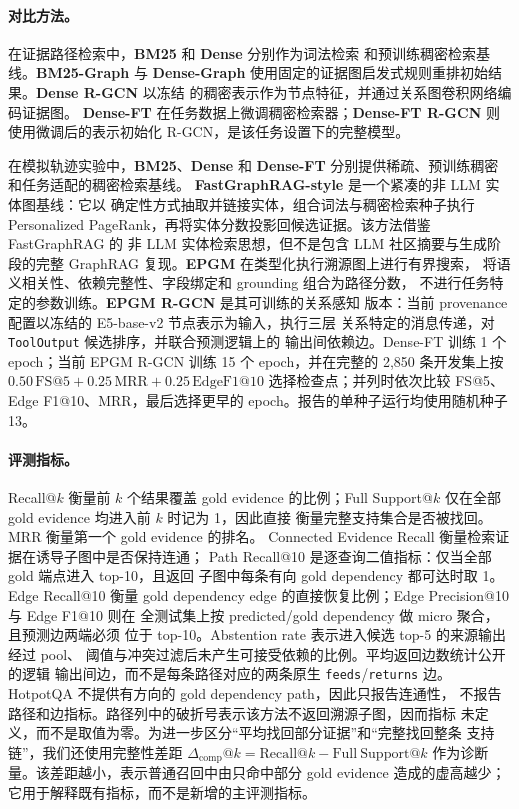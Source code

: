 \paragraph{对比方法。}
在证据路径检索中，\textbf{BM25} 和 \textbf{Dense} 分别作为词法检索
和预训练稠密检索基线。\textbf{BM25-Graph} 与 \textbf{Dense-Graph}
使用固定的证据图启发式规则重排初始结果。\textbf{Dense R-GCN} 以冻结
的稠密表示作为节点特征，并通过关系图卷积网络编码证据图。
\textbf{Dense-FT} 在任务数据上微调稠密检索器；\textbf{Dense-FT R-GCN}
则使用微调后的表示初始化 R-GCN，是该任务设置下的完整模型。

在模拟轨迹实验中，\textbf{BM25}、\textbf{Dense} 和 \textbf{Dense-FT}
分别提供稀疏、预训练稠密和任务适配的稠密检索基线。
\textbf{FastGraphRAG-style} 是一个紧凑的非 LLM 实体图基线：它以
确定性方式抽取并链接实体，组合词法与稠密检索种子执行 Personalized
PageRank，再将实体分数投影回候选证据。该方法借鉴 FastGraphRAG 的
非 LLM 实体检索思想，但不是包含 LLM 社区摘要与生成阶段的完整
GraphRAG 复现。\textbf{EPGM} 在类型化执行溯源图上进行有界搜索，
将语义相关性、依赖完整性、字段绑定和 grounding 组合为路径分数，
不进行任务特定的参数训练。\textbf{EPGM R-GCN} 是其可训练的关系感知
版本：当前 provenance 配置以冻结的 E5-base-v2 节点表示为输入，执行三层
关系特定的消息传递，对 \texttt{ToolOutput} 候选排序，并联合预测逻辑上的
输出间依赖边。Dense-FT 训练 1 个 epoch；当前 EPGM R-GCN 训练 15 个
epoch，并在完整的 2,850 条开发集上按
$0.50\,\mathrm{FS@5}+0.25\,\mathrm{MRR}+0.25\,\mathrm{EdgeF1@10}$
选择检查点；并列时依次比较 FS@5、Edge F1@10、MRR，最后选择更早的
epoch。报告的单种子运行均使用随机种子 13。

\paragraph{评测指标。}
Recall@$k$ 衡量前 $k$ 个结果覆盖 gold evidence 的比例；Full
Support@$k$ 仅在全部 gold evidence 均进入前 $k$ 时记为 1，因此直接
衡量完整支持集合是否被找回。MRR 衡量第一个 gold evidence 的排名。
Connected Evidence Recall 衡量检索证据在诱导子图中是否保持连通；
Path Recall@10 是逐查询二值指标：仅当全部 gold 端点进入 top-10，且返回
子图中每条有向 gold dependency 都可达时取 1。Edge Recall@10 衡量 gold
dependency edge 的直接恢复比例；Edge Precision@10 与 Edge F1@10 则在
全测试集上按 predicted/gold dependency 做 micro 聚合，且预测边两端必须
位于 top-10。Abstention rate 表示进入候选 top-5 的来源输出经过 pool、
阈值与冲突过滤后未产生可接受依赖的比例。平均返回边数统计公开的逻辑
输出间边，而不是每条路径对应的两条原生 \texttt{feeds}/\texttt{returns}
边。HotpotQA 不提供有方向的 gold dependency path，因此只报告连通性，
不报告路径和边指标。路径列中的破折号表示该方法不返回溯源子图，因而指标
未定义，而不是取值为零。为进一步区分“平均找回部分证据”和“完整找回整条
支持链”，我们还使用完整性差距
$\Delta_{\mathrm{comp}}@k=\mathrm{Recall}@k-\mathrm{Full\ Support}@k$
作为诊断量。该差距越小，表示普通召回中由只命中部分 gold evidence
造成的虚高越少；它用于解释既有指标，而不是新增的主评测指标。

